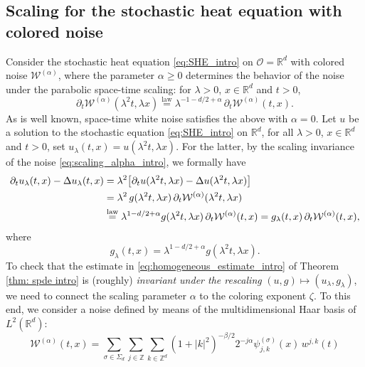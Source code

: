 \documentclass[reqno]{amsart}
\theoremstyle{plain}
\theoremstyle{remark}
\theoremstyle{plain}
\numberwithin{equation}{section}
\newcommand\cO{\mathcal{O}}
\newcommand\cW{\mathcal{W}}
\def\Z{{\mathbb Z}}
\def\R{{\mathbb R}}
\newcommand{\1}{\one}
\begin{document}
\subsection{Scaling for the stochastic heat equation with colored noise}
\label{ss:scaling_intro}
Consider the stochastic heat equation \eqref{eq:SHE_intro} on $\cO=\R^d$ with colored noise $\cW^{(\alpha)}$, where the parameter $\alpha\geq 0$ determines the behavior of the noise under the parabolic space-time scaling: for $\lambda>0$, $x\in\R^d$ and $t>0$,
\begin{equation}
\label{eq:scaling_alpha_intro}
\partial_t \cW^{(\alpha)}(\lambda^2 t,\lambda x)\stackrel{\text{law}}{=}\lambda^{-1-d/2+\alpha}\,\partial_t \cW^{(\alpha)}( t, x).
\end{equation} 
As is well known, space-time white noise satisfies the above with $\alpha=0$.
Let $u$ be a solution to the stochastic equation \eqref{eq:SHE_intro} on $\R^d$, for all $\lambda>0$, $x\in \R^d$ and $t>0$, set 
$
u_\lambda (t,x)=u(\lambda^2 t ,\lambda x)
$. For the latter, by the scaling invariance of the noise \eqref{eq:scaling_alpha_intro}, we formally have
\begin{align*}
\partial_t u_\lambda(t,x) -\Delta u_\lambda(t,x) 
&  = \lambda^2 \big[\partial_t u(\lambda^2 t, \lambda x) - \Delta u(\lambda^2 t, \lambda x)\big]\\
& = \lambda^2 \, g(\lambda^2 t ,\lambda x )\,\partial_t \cW^{(\alpha)}(\lambda^2 t,\lambda x)\\
&\stackrel{{\rm law}}{=}\lambda^{1-d/2+\alpha} g(\lambda^2 t ,\lambda x )\,\partial_t\cW^{(\alpha)}(t,x)
= g_{\lambda}(t,x) \,\partial_t\cW^{(\alpha)}(t,x),
\end{align*}
where 
\begin{equation*}
g_\lambda(t,x)= \lambda^{1-d/2+\alpha} g(\lambda^2 t ,\lambda x).
\end{equation*}
%
To check that the estimate in \eqref{eq:homogeneous_estimate_intro} of Theorem \ref{thm: spde intro} is (roughly) \emph{invariant under the rescaling} $(u,g)\mapsto (u_\lambda,g_\lambda)$, we need to connect the scaling parameter $\alpha$ to the coloring exponent $\zeta$. To this end, we consider a noise defined by means of the multidimensional Haar basis of $L^2(\R^d)$:
\begin{equation}
\label{eq:noise_invariance_scaling_intro}
\cW^{(\alpha)}(t,x)=\sum_{\sigma\in \Sigma_d} \sum_{j\in \Z}\sum_{k\in \Z^d} 
(1+|k|^2)^{-\beta/2} 2^{-j\alpha} \psi_{j,k}^{(\sigma)} (x)\, w^{j,k}(t)
\end{equation}
\end{document}
